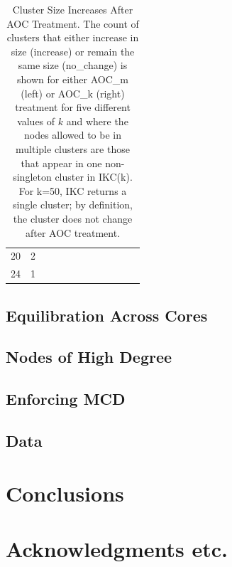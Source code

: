\documentclass[12pt, oneside]{article}   	%
\begin{document}
\begin{table}
{\begin{tabular}{clllllllllll}
20 &   2 &  &  &  &  &  &  &  &  &  \\ 
24 &   1 &  &  &  &  &  &  &  &  &  \\ 
   \hline
\end{tabular}}
\caption{Cluster Size Increases After AOC Treatment. The count of clusters that either increase in size (increase) or remain the same size (no\_change) is shown
for either AOC\_m (left) or AOC\_k (right) treatment for five different values of $k$ and where the nodes allowed to be in multiple clusters are those that appear in one non-singleton cluster in IKC(k). 
 For k=50, IKC returns a single cluster; by definition, the cluster does not change after AOC treatment.}
\label{tab:tab2}
\end{table}

\clearpage


\subsection{Equilibration Across Cores}

\subsection{Nodes of High Degree}

\subsection{Enforcing MCD}

\subsection{Data}

\section{Conclusions}
\section{Acknowledgments etc.}





\end{document}
